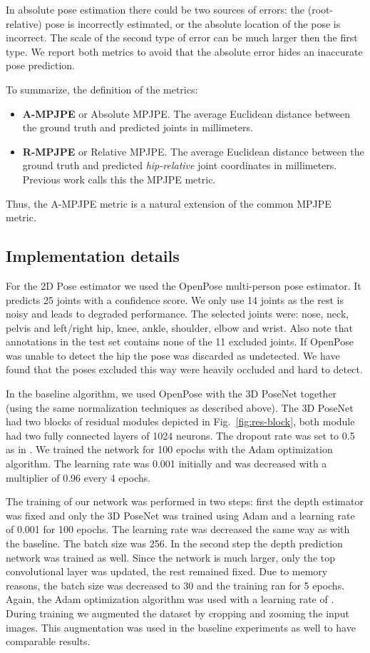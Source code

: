 \documentclass[conference]{IEEEtran}
\begin{document}
In absolute pose estimation there could be two sources of errors: the (root-relative) pose is incorrectly estimated, or the absolute location of the pose is incorrect. The scale of the second type of error can be much larger then the first type. We report both metrics to avoid that the absolute error hides an inaccurate pose prediction. 

To summarize, the definition of the metrics:

\begin{itemize}
    \item \textbf{A-MPJPE} or Absolute MPJPE. The average Euclidean distance between the ground truth and predicted joints in millimeters.
    \item \textbf{R-MPJPE} or Relative MPJPE. The average Euclidean distance between the ground truth and predicted \textit{hip\nobreakdash-relative} joint coordinates in millimeters. Previous work calls this the MPJPE metric.
\end{itemize}
Thus, the A-MPJPE metric is a natural extension of the common MPJPE metric.

\subsection{Implementation details}
For the 2D Pose estimator we used the OpenPose \cite{openpose} multi-person pose estimator. It predicts 25 joints with a confidence score. We only use 14 joints as the rest is noisy and leads to degraded performance. The selected joints were: nose, neck, pelvis and left/right hip, knee, ankle, shoulder, elbow and wrist. Also note that annotations in the test set contains none of the 11 excluded joints. If OpenPose was unable to detect the hip the pose was discarded as undetected. We have found that the poses excluded this way were heavily occluded and hard to detect.

In the baseline algorithm, we used OpenPose with the 3D PoseNet together (using the same normalization techniques as described above). The 3D PoseNet had two blocks of residual modules depicted in Fig.~\ref{fig:res-block}, both module had two fully connected layers of 1024 neurons. The dropout rate was set to 0.5 as in \cite{3dbaseline}. We trained the network for 100 epochs with the Adam optimization algorithm. The learning rate was 0.001 initially and was decreased with a multiplier of 0.96 every 4 epochs. 

The training of our network was performed in two steps: first the depth estimator was fixed and only the 3D PoseNet was trained using Adam and a learning rate of 0.001 for 100 epochs. The learning rate was decreased the same way as with the baseline. The batch size was 256. In the second step the depth prediction network was trained as well. Since the network is much larger, only the top convolutional layer was updated, the rest remained fixed. Due to memory reasons, the batch size was decreased to 30 and the training ran for 5 epochs. Again, the Adam optimization algorithm was used with a learning rate of . During training we augmented the dataset by cropping and zooming the input images. This augmentation was used in the baseline experiments as well to have comparable results.
\end{document}
